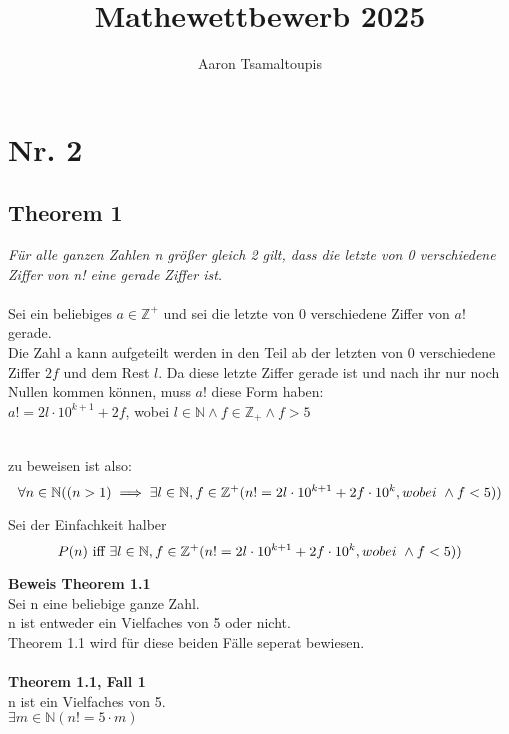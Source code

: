 \documentclass[12pt, letterpaper]{article}
\title{Mathewettbewerb 2025}
\author{Aaron Tsamaltoupis}
\begin{document}
\maketitle
\tableofcontents
\newpage
\newpage
\section{Nr. 2}
\label{sec:Nr. 2}


\subsection{Theorem 1}
\label{sec:Theorem 1}
\textit{Für alle ganzen Zahlen n größer gleich 2 gilt, dass die letzte von 0 verschiedene Ziffer von n! eine gerade Ziffer ist.} \\\\
Sei ein beliebiges $a\in \mathbb{Z}^{+}$ und sei die letzte von 0 verschiedene Ziffer von $a!$ gerade.\\
Die Zahl a kann aufgeteilt werden in den Teil ab der letzten von 0 verschiedene Ziffer $2f$ und dem Rest $l$. Da diese letzte Ziffer gerade ist und nach ihr nur noch Nullen kommen können, muss $a!$ diese Form haben:\\
$a! = 2l\cdot 10^{k+1}+2f$, wobei $l\in \mathbb{N}\land f \in \mathbb{Z}_{+}\land f>5$\\\




zu beweisen ist also: \[  
  \forall n \in \mathbb{N}((n>1)\implies \exists l\in \mathbb{N}, f\in \mathbb{Z}^{+}(n! = 2l\cdot 10^{k+1}+2f\cdot 10^{k}, wobei\ \land f<5  ))\\
\]

Sei der Einfachkeit halber \[  
  P(n)\ \textnormal{iff}\ \exists l\in\mathbb{N}, f\in\mathbb{Z}^{+}(n! = 2l\cdot 10^{k+1}+2f\cdot 10^{k}, wobei\ \land f<5  ))\\

\]


\textbf{Beweis Theorem 1.1} \\
Sei n eine beliebige ganze Zahl.\\
n ist entweder ein Vielfaches von 5 oder nicht.
 \\Theorem 1.1 wird für diese beiden Fälle seperat bewiesen.\\

\\\newpage
\textbf{Theorem 1.1, Fall 1} \\
\label{sec:Fall 1}
n ist ein Vielfaches von 5.\\
$\exists m \in \mathbb{N}(n! = 5\cdot m)$\\
\end{document}
